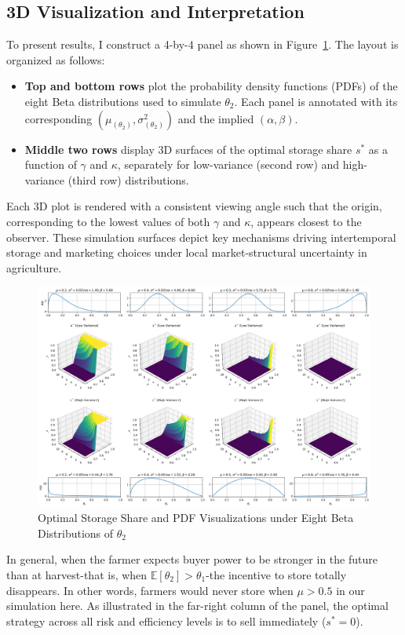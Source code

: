 \subsection{3D Visualization and Interpretation}
\noindent To present results, I construct a 4-by-4 panel as shown in Figure~\ref{Figure:3D_formulation}. The layout is organized as follows:
\begin{itemize}
\item \textbf{Top and bottom rows} plot the probability density functions (PDFs) of the eight Beta distributions used to simulate $\theta_2$. Each panel is annotated with its corresponding $(\mu_{(\theta_2)}, \sigma^2_{(\theta_2)})$ and the implied $(\alpha, \beta)$.
\item \textbf{Middle two rows} display 3D surfaces of the optimal storage share $s^*$ as a function of $\gamma$ and $\kappa$, separately for low-variance (second row) and high-variance (third row) distributions.
\end{itemize}
Each 3D plot is rendered with a consistent viewing angle such that the origin, corresponding to the lowest values of both $\gamma$ and $\kappa$, appears closest to the observer. These simulation surfaces depict key mechanisms driving intertemporal storage and marketing choices under local market-structural uncertainty in agriculture.

\begin{figure}[ht!]
\centering
\includegraphics[width=\textwidth]{model_figures/3D_formulation.png}
\caption{Optimal Storage Share and PDF Visualizations under Eight Beta Distributions of $\theta_2$}
\label{Figure:3D_formulation}
\end{figure}

In general, when the farmer expects buyer power to be stronger in the future than at harvest-that is, when $\mathbb{E}[\theta_2] > \theta_1$-the incentive to store totally disappears. In other words, farmers would never store when $\mu > 0.5$ in our simulation here. As illustrated in the far-right column of the panel, the optimal strategy across all risk and efficiency levels is to sell immediately ($s^* = 0$).

